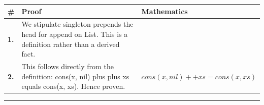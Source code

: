 \documentclass[11pt]{article}
\theoremstyle{definition}
\begin{document}
\medskip
\noindent
\begin{tabular}{@{} >{\raggedright\arraybackslash}p{} >{\raggedright\arraybackslash}p{} >{\raggedleft\arraybackslash}p{} @{}}
\textbf{\#} & \textbf{Proof} & \textbf{Mathematics} \\
\midrule
\textbf{1.} & We stipulate singleton prepends the head for append on List. This is a definition rather than a derived fact. & \\[0.45em]
\textbf{2.} & This follows directly from the definition: cons(x, nil) plus plus xs equals cons(x, xs). Hence proven. & $\displaystyle cons(x, nil) ++ xs = cons(x, xs)$ \\[0.45em]
\bottomrule
\end{tabular}
\label{thm:List-append-singleton_prepends_the_head}
\par\medskip\hrule
\end{document}
